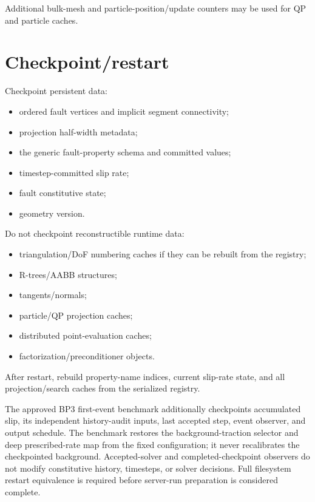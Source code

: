 \documentclass[11pt]{article}
\begin{document}
Additional bulk-mesh and particle-position/update counters may be used for QP and particle caches.

\section{Checkpoint/restart}

Checkpoint persistent data:
\begin{itemize}
  \item ordered fault vertices and implicit segment connectivity;
  \item projection half-width metadata;
  \item the generic fault-property schema and committed values;
  \item timestep-committed slip rate;
  \item fault constitutive state;
  \item geometry version.
\end{itemize}

Do not checkpoint reconstructible runtime data:
\begin{itemize}
  \item triangulation/DoF numbering caches if they can be rebuilt from the registry;
  \item R-trees/AABB structures;
  \item tangents/normals;
  \item particle/QP projection caches;
  \item distributed point-evaluation caches;
  \item factorization/preconditioner objects.
\end{itemize}

After restart, rebuild property-name indices, current slip-rate state, and all
projection/search caches from the serialized registry.

The approved BP3 first-event benchmark additionally checkpoints accumulated
slip, its independent history-audit inputs, last accepted step, event observer,
and output schedule. The benchmark restores the background-traction selector
and deep prescribed-rate map from the fixed configuration; it never recalibrates
the checkpointed background. Accepted-solver and completed-checkpoint observers
do not modify constitutive history, timesteps, or solver decisions. Full
filesystem restart equivalence is required before server-run preparation is
considered complete.
\end{document}
